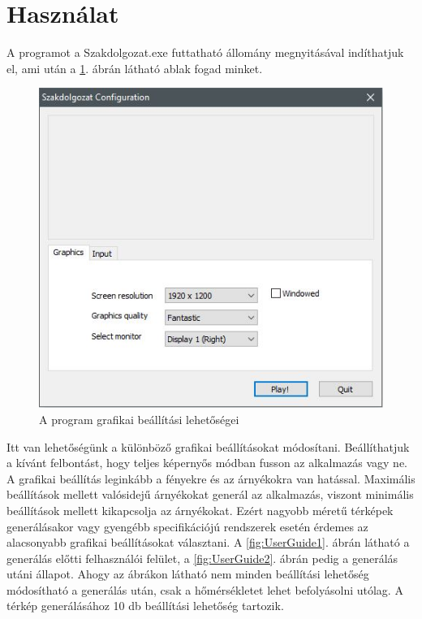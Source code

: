 \section*{Használat}
A programot a Szakdolgozat.exe futtatható állomány megnyitásával indíthatjuk el, ami után a \ref{fig:UnityStartUp}. ábrán látható ablak fogad minket.

\begin{figure}[h!]
\centering
\includegraphics[scale=0.6]{kepek/UnityStartUp.JPG}
\caption{A program grafikai beállítási lehetőségei}
\label{fig:UnityStartUp}
\end{figure}

\noindent Itt van lehetőségünk a különböző grafikai beállításokat módosítani. Beállíthatjuk a kívánt felbontást, hogy teljes képernyős módban fusson az alkalmazás vagy ne. A grafikai beállítás leginkább a fényekre és az árnyékokra van hatással. Maximális beállítások mellett valósidejű árnyékokat generál az alkalmazás, viszont minimális beállítások mellett kikapcsolja az árnyékokat. Ezért nagyobb méretű térképek generálásakor vagy gyengébb specifikációjú rendszerek esetén érdemes az alacsonyabb grafikai beállításokat választani.
\newline
\newline A \ref{fig:UserGuide1}. ábrán látható a generálás előtti felhasználói felület, a \ref{fig:UserGuide2}. ábrán pedig a generálás utáni állapot. Ahogy az ábrákon látható nem minden beállítási lehetőség módosítható a generálás után, csak a hőmérsékletet lehet befolyásolni utólag. A térkép generálásához 10 db beállítási lehetőség tartozik.

